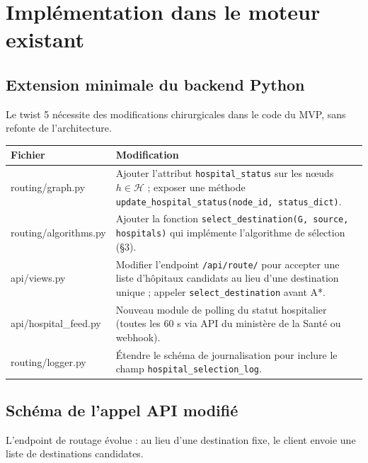 \documentclass[12pt,a4paper]{article}
\theoremstyle{definition}
\theoremstyle{remark}
\begin{document}
\newpage

\section{Implémentation dans le moteur existant}

\subsection{Extension minimale du backend Python}

Le twist 5 nécessite des modifications chirurgicales dans le code
du MVP, sans refonte de l'architecture.

\begin{center}
\begin{tabular}{>{\ttfamily}p{4cm} p{9cm}}
  \toprule
  \textbf{Fichier} & \textbf{Modification} \\
  \midrule
  routing/graph.py &
    Ajouter l'attribut \texttt{hospital\_status} sur les nœuds
    $h \in \mathcal{H}$ ; exposer une méthode
    \texttt{update\_hospital\_status(node\_id, status\_dict)}. \\[0.4em]
  routing/algorithms.py &
    Ajouter la fonction \texttt{select\_destination(G, source, hospitals)}
    qui implémente l'algorithme de sélection (§3). \\[0.4em]
  api/views.py &
    Modifier l'endpoint \texttt{/api/route/} pour accepter une liste
    d'hôpitaux candidats au lieu d'une destination unique ; appeler
    \texttt{select\_destination} avant A*. \\[0.4em]
  api/hospital\_feed.py &
    Nouveau module de polling du statut hospitalier (toutes les 60 s
    via API du ministère de la Santé ou webhook). \\[0.4em]
  routing/logger.py &
    Étendre le schéma de journalisation pour inclure le champ
    \texttt{hospital\_selection\_log}. \\
  \bottomrule
\end{tabular}
\end{center}

\subsection{Schéma de l'appel API modifié}

L'endpoint de routage évolue : au lieu d'une destination fixe,
le client envoie une liste de destinations candidates.
\end{document}
